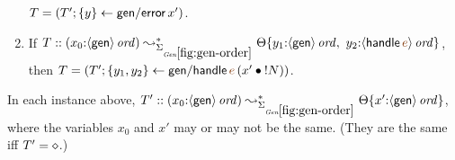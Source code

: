 \begin{lemma}
\begin{enumerate}
   $T = \left(T'; \{{y}\} \leftarrow {{\sf gen/error}\,x'}\right)$.
\medskip
\item If 
   $T :: (x_0{:}\istrue{\susp{\sf gen}}) \leadsto^*_{\siggenorder}
         \tackon{\Theta}{y_1{:}\istrue{\susp{{\sf gen}}}, ~
                         y_2{:}\istrue{\susp{{\sf handle}\,\lf{e}}}}$,
\\ then 
   $T = \left(T'; \trstep{y_1,y_2}{{\sf gen/handle}\,\lf{e}\,(\tfuser{x'}{\tbangr{N}})}\right)$.
\medskip
\end{enumerate}
In each instance above, 
$T' :: (x_0{:}\istrue{\susp{\sf gen}}) \leadsto^*_{\siggenorder}
          \tackon{\Theta}{x'{:}\istrue{\susp{{\sf gen}}}}$,
where the variables $x_0$ and $x'$ may or may not
be the same. (They are the same iff $T' = \diamond$.)
\end{lemma}

